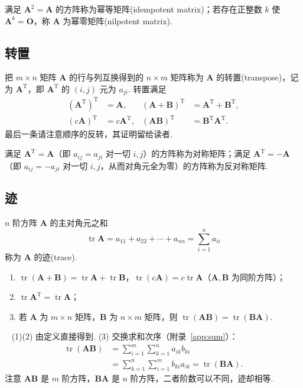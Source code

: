 \documentclass[lang=cn,10.5pt,scheme=chinese,toc=twocol,section,chinesefont=nofont,
twoside,citestyle=gb7714-2015,bibstyle=gb7714-2015]{elegantbook}
\DeclareRobustCommand{\textbf}[1]{{\lnsemiboldlatin\lnsemiboldcjk #1}}
\newcommand{\vv}[1]{\boldsymbol{#1}}
\newcommand{\trans}{\mathrm{T}}             %
\numberwithin{equation}{section}   %
\providecommand{\tr}{\operatorname{tr}}     %
\newcommand*{\lnlabel}[1]{{\sffamily\bfseries\color{black}#1}}
\renewenvironment{proof}{%
	\par\noindent\lnlabel{\proofname}\;\ \color{black!90}\cfs}{\par}
\begin{document}
满足 $\vv A^2=\vv A$ 的方阵称为\textbf{幂等矩阵}(idempotent matrix)；若存在正整数 $k$ 使 $\vv A^k=\vv O$，称 $\vv A$ 为\textbf{幂零矩阵}(nilpotent matrix).

\subsection{转置}

把 $m\times n$ 矩阵 $\vv A$ 的行与列互换得到的 $n\times m$ 矩阵称为 $\vv A$ 的\textbf{转置}(transpose)，记为 $\vv A^\trans$，即 $\vv A^\trans$ 的 $(i,j)$ 元为 $a_{ji}$. 转置满足
\[
  \begin{aligned}
    (\vv{A}^\trans)^\trans & =\vv{A},         & (\vv{A}+\vv{B})^\trans & =\vv{A}^\trans+\vv{B}^\trans, \\
    (c\vv{A})^\trans       & =c\vv{A}^\trans, & (\vv{AB})^\trans       & =\vv{B}^\trans\vv{A}^\trans.
  \end{aligned}
\]
最后一条请注意顺序的反转，其证明留给读者.

满足 $\vv A^\trans=\vv A$（即 $a_{ij}=a_{ji}$ 对一切 $i,j$）的方阵称为\textbf{对称矩阵}；满足 $\vv A^\trans=-\vv A$（即 $a_{ij}=-a_{ji}$ 对一切 $i,j$，从而对角元全为零）的方阵称为\textbf{反对称矩阵}.
\subsection{迹}

\begin{definition}
  $n$ 阶方阵 $\vv A$ 的主对角元之和
  \[\tr\vv A=a_{11}+a_{22}+\cdots+a_{nn}=\sum_{i=1}^na_{ii}\]
  称为 $\vv A$ 的\textbf{迹}(trace).
\end{definition}

\begin{proposition}
  \label{prop:trace}
  \begin{enumerate}
    \item $\tr(\vv A+\vv B)=\tr\vv A+\tr\vv B$，$\tr(c\vv A)=c\tr\vv A$（$\vv A,\vv B$ 为同阶方阵）；
    \item $\tr\vv A^\trans=\tr\vv A$；
    \item 若 $\vv A$ 为 $m\times n$ 矩阵，$\vv B$ 为 $n\times m$ 矩阵，则 $\tr(\vv{AB})=\tr(\vv{BA})$.
  \end{enumerate}
\end{proposition}
\begin{proof}
  (1)(2) 由定义直接得到. (3) 交换求和次序（附录~\ref{app:sum}）：
  \[
    \begin{aligned}
      \tr(\vv{AB}) & =\sum_{i=1}^m\sum_{k=1}^na_{ik}b_{ki}               \\
                   & =\sum_{k=1}^n\sum_{i=1}^mb_{ki}a_{ik}=\tr(\vv{BA}).
    \end{aligned}
  \]
  注意 $\vv{AB}$ 是 $m$ 阶方阵，$\vv{BA}$ 是 $n$ 阶方阵，二者阶数可以不同，迹却相等.
\end{proof}
\end{document}
